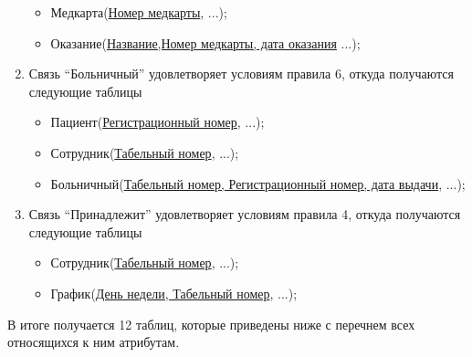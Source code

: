 \documentclass[14pt,a4paper,russian]{extreport}
\begin{document}
\begin{enumerate}
\begin{itemize}
            \item Медкарта(\underline{Номер медкарты}, ...);
            \item Оказание(\underline{Название,Номер медкарты, дата оказания} ...);
        \end{itemize}
    \item Связь ``Больничный'' удовлетворяет условиям правила 6, откуда получаются следующие
        таблицы
        \begin{itemize}
            \item Пациент(\underline{Регистрационный номер}, ...);
            \item Сотрудник(\underline{Табельный номер}, ...);
            \item Больничный(\underline{Табельный номер, Регистрационный номер, дата выдачи}, ...);
        \end{itemize}
    \item Связь ``Принадлежит'' удовлетворяет условиям правила 4, откуда получаются следующие
        таблицы
        \begin{itemize}
            \item Сотрудник(\underline{Табельный номер}, ...);
            \item График(\underline{День недели, Табельный номер}, ...);
        \end{itemize}
\end{enumerate}
В итоге получается 12 таблиц, которые приведены ниже с перечнем всех относящихся к ним атрибутам.
\end{document}
